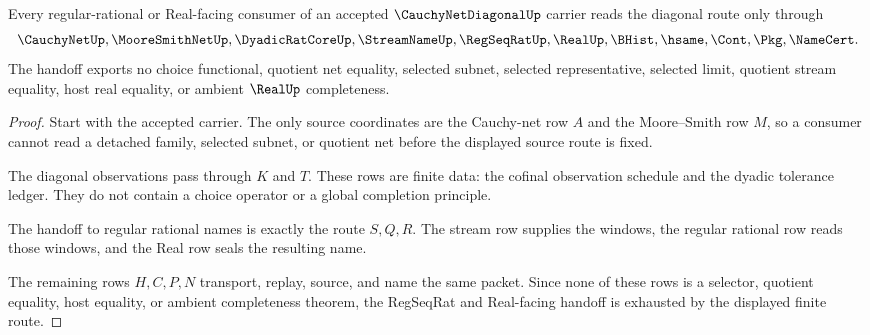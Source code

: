 \begin{theorem}
\label{thm:cauchy-net-diagonal-regseqrat-handoff}
Every regular-rational or Real-facing consumer of an accepted $\CauchyNetDiagonalUp$ carrier reads the diagonal route only through
$$
\CauchyNetUp,\MooreSmithNetUp,\DyadicRatCoreUp,\StreamNameUp,\RegSeqRatUp,\RealUp,\BHist,\hsame,\Cont,\Pkg,\NameCert .
$$
The handoff exports no choice functional, quotient net equality, selected subnet, selected representative, selected limit, quotient stream equality, host real equality, or ambient $\RealUp$ completeness.
\end{theorem}
\begin{proof}
Start with the accepted carrier. The only source coordinates are the Cauchy-net row $A$ and the Moore--Smith row $M$, so a consumer cannot read a detached family, selected subnet, or quotient net before the displayed source route is fixed.

The diagonal observations pass through $K$ and $T$. These rows are finite data: the cofinal observation schedule and the dyadic tolerance ledger. They do not contain a choice operator or a global completion principle.

The handoff to regular rational names is exactly the route $S,Q,R$. The stream row supplies the windows, the regular rational row reads those windows, and the Real row seals the resulting name.

The remaining rows $H,C,P,N$ transport, replay, source, and name the same packet. Since none of these rows is a selector, quotient equality, host equality, or ambient completeness theorem, the RegSeqRat and Real-facing handoff is exhausted by the displayed finite route.
\end{proof}


\begin{closurestatus}{\CauchyNetDiagonalUp}
  \theoryclosure{\seedClosure}
  \formalstatus{\theoremCheckedV}
\end{closurestatus}
